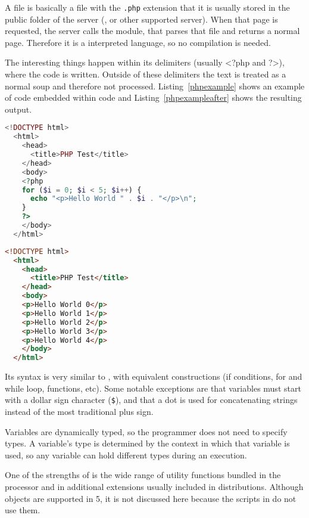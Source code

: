 A  file is basically a  file with the \texttt{.php} extension that it is usually stored in the public folder of the server (,  or other supported server).
When that page is requested, the server calls the  module, that parses that file and returns a normal  page.
Therefore it is a interpreted language, so no compilation is needed.

The interesting things happen within its delimiters
(usually <?php and ?>), where the  code is written.
Outside of these delimiters the text is treated as a normal  soup and therefore not processed.
Listing~\ref{phpexample} shows an example of  code embedded within  code and Listing~\ref{phpexampleafter} shows the resulting  output.

\begin{lstlisting}[float=htbp,label=phpexample,language=php,alsolanguage=html,caption=\idx{PHP} code embedded within \idx{HTML} code]
  <!DOCTYPE html>
  <html>
    <head>
      <title>PHP Test</title>
    </head>
    <body>
    <?php
    for ($i = 0; $i < 5; $i++) {
      echo "<p>Hello World " . $i . "</p>\n";
    }
    ?>
    </body>
  </html>
\end{lstlisting}

\begin{lstlisting}[float=htbp,label=phpexampleafter,language=html,caption=Resulting \idx{HTML} code]
  <!DOCTYPE html>
  <html>
    <head>
      <title>PHP Test</title>
    </head>
    <body>
    <p>Hello World 0</p>
    <p>Hello World 1</p>
    <p>Hello World 2</p>
    <p>Hello World 3</p>
    <p>Hello World 4</p>
    </body>
  </html>
\end{lstlisting}

Its syntax is very similar to , with equivalent constructions (if conditions, for and while loop, functions, etc).
Some notable exceptions are that variables must start with a dollar sign character (\texttt{\$}), and that a dot is used for concatenating strings instead of the most traditional plus sign.

Variables are dynamically typed, so the programmer does not need to specify types. A variable's type is determined by the context in which that variable is used, so any variable can hold different types during an execution.

One of the strengths of  is the wide range of utility functions bundled in the processor and in additional extensions usually included in distributions.
Although objects are supported in  5, it is not discussed here because the scripts in  do not use them.


